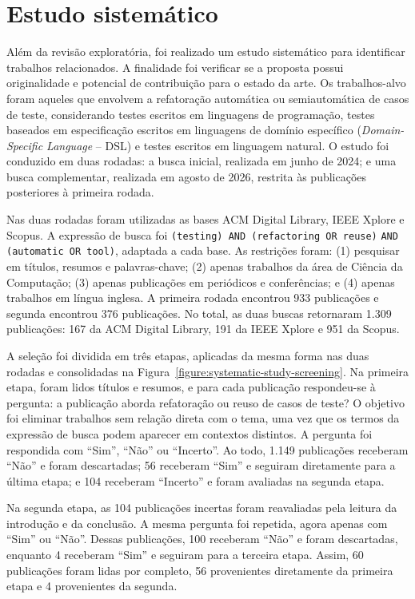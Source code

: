\section{Estudo sistemático}

Além da revisão exploratória, foi realizado um estudo sistemático para identificar trabalhos relacionados. A finalidade foi verificar se a proposta possui originalidade e potencial de contribuição para o estado da arte. Os trabalhos-alvo foram aqueles que envolvem a refatoração automática ou semiautomática de casos de teste, considerando testes escritos em linguagens de programação, testes baseados em especificação escritos em linguagens de domínio específico (\textit{Domain-Specific Language} -- DSL) e testes escritos em linguagem natural. O estudo foi conduzido em duas rodadas: a busca inicial, realizada em junho de 2024; e uma busca complementar, realizada em agosto de 2026, restrita às publicações posteriores à primeira rodada.

Nas duas rodadas foram utilizadas as bases ACM Digital Library, IEEE Xplore e Scopus. A expressão de busca foi \texttt{(testing) AND (refactoring OR reuse)} \texttt{AND (automatic OR tool)}, adaptada a cada base. As restrições foram: (1) pesquisar em títulos, resumos e palavras-chave; (2) apenas trabalhos da área de Ciência da Computação; (3) apenas publicações em periódicos e conferências; e (4) apenas trabalhos em língua inglesa. A primeira rodada encontrou 933 publicações e segunda encontrou 376 publicações. No total, as duas buscas retornaram 1.309 publicações: 167 da ACM Digital Library, 191 da IEEE Xplore e 951 da Scopus.

A seleção foi dividida em três etapas, aplicadas da mesma forma nas duas rodadas e consolidadas na Figura~\ref{figure:systematic-study-screening}. Na primeira etapa, foram lidos títulos e resumos, e para cada publicação respondeu-se à pergunta: a publicação aborda refatoração ou reuso de casos de teste? O objetivo foi eliminar trabalhos sem relação direta com o tema, uma vez que os termos da expressão de busca podem aparecer em contextos distintos. A pergunta foi respondida com ``Sim'', ``Não'' ou ``Incerto''. Ao todo, 1.149 publicações receberam ``Não'' e foram descartadas; 56 receberam ``Sim'' e seguiram diretamente para a última etapa; e 104 receberam ``Incerto'' e foram avaliadas na segunda etapa.

Na segunda etapa, as 104 publicações incertas foram reavaliadas pela leitura da introdução e da conclusão. A mesma pergunta foi repetida, agora apenas com ``Sim'' ou ``Não''. Dessas publicações, 100 receberam ``Não'' e foram descartadas, enquanto 4 receberam ``Sim'' e seguiram para a terceira etapa. Assim, 60 publicações foram lidas por completo, 56 provenientes diretamente da primeira etapa e 4 provenientes da segunda.

